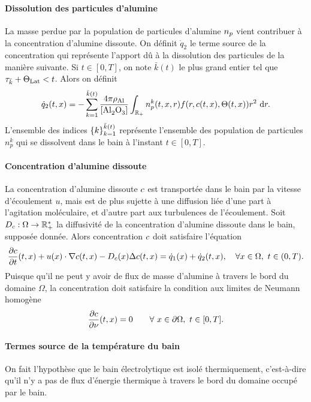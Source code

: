 \paragraph{Dissolution des particules d'alumine}
La masse perdue par la population de particules d'alumine
$n_p$ vient contribuer à la concentration d'alumine
dissoute. On définit $\dot q_2$ le terme source de la concentration
qui représente l'apport dû à la dissolution des particules de la
manière suivante. Si $t \in [0, T]$, on note $\bar k(t)$ le plus grand
entier tel que $\tau_{\bar k} + \Theta_\text{Lat} < t$. Alors on définit
\begin{equation}
  \dot q_2(t, x) = -\sum_{k = 1}^{\bar
    k(t)}\frac{4\pi\aluminadensity}{[\ce{Al2O3}]}\int_{\rplus}n_p^k(t,
  x, r)f(r, \concentration(t, x), \temperature(t, x))r^2\,\intd{r}.
\end{equation}
L'ensemble des indices $\left\{ k \right\}_{k = 1}^{\bar k(t)}$ représente
l'ensemble des population de particules $n_p^k$ qui se dissolvent dans
le bain à l'instant $t\in[0, T]$.

\paragraph{Concentration d'alumine dissoute}
La concentration d'alumine dissoute $c$ est transportée
dans le bain par la vitesse d'écoulement $u$, mais est de plus sujette
à une diffusion liée d'une part à l'agitation moléculaire, et d'autre
part aux turbulences de l'écoulement. Soit
$D_c:\Omega\to\mathbb R^*_+$ la diffusivité de la
concentration d'alumine dissoute dans le bain, supposée donnée. Alors
concentration $c$ doit satisfaire l'équation
\begin{equation}\label{eq:concentration}
  \frac{\partial c}{\partial t}(t, x) + u(x)\cdot\nabla c(t, x) - D_c(x)
  \Delta c(t, x) = \dot q_1(x) + \dot q_2(t, x),\quad \forall
  x\in\Omega,\ t\in (0, T).
\end{equation}
Puisque qu'il ne peut y avoir de flux de masse d'alumine à travers le
bord du domaine $\Omega$, la concentration doit satisfaire la
condition aux limites de Neumann homogène
\begin{equation}\label{eq:c-bc}
  \frac{\partial c}{\partial \nu}(t, x) = 0 \quad  \quad
  \forall\ x\in\partial \Omega,\ t\in[0, T].
\end{equation}

\paragraph{Termes source de la température du bain}
On fait l'hypothèse que le bain électrolytique est isolé
thermiquement, c'est-à-dire qu'il n'y a pas de flux d'énergie
thermique à travers le bord du domaine occupé par le bain.

